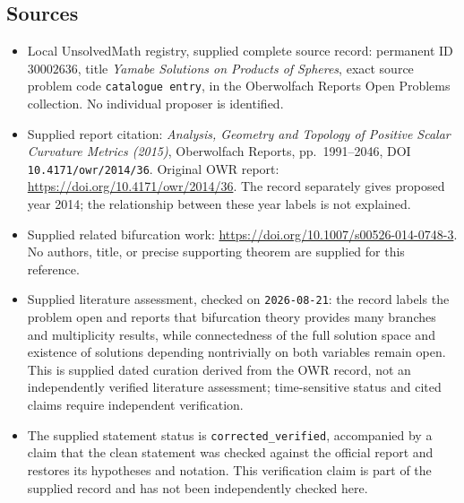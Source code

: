 \documentclass[11pt]{article}
\begin{document}
\subsection{Sources}
\begin{itemize}
\item Local UnsolvedMath registry, supplied complete source record: permanent ID \(30002636\), title \emph{Yamabe Solutions on Products of Spheres}, exact source problem code \texttt{catalogue entry}, in the Oberwolfach Reports Open Problems collection. No individual proposer is identified.
\item Supplied report citation: \emph{Analysis, Geometry and Topology of Positive Scalar Curvature Metrics (2015)}, Oberwolfach Reports, pp.~1991--2046, DOI \texttt{10.4171/owr/2014/36}. Original OWR report: \url{https://doi.org/10.4171/owr/2014/36}. The record separately gives proposed year 2014; the relationship between these year labels is not explained.
\item Supplied related bifurcation work: \url{https://doi.org/10.1007/s00526-014-0748-3}. No authors, title, or precise supporting theorem are supplied for this reference.
\item Supplied literature assessment, checked on \texttt{2026-08-21}: the record labels the problem open and reports that bifurcation theory provides many branches and multiplicity results, while connectedness of the full solution space and existence of solutions depending nontrivially on both variables remain open. This is supplied dated curation derived from the OWR record, not an independently verified literature assessment; time-sensitive status and cited claims require independent verification.
\item The supplied statement status is \texttt{corrected\_verified}, accompanied by a claim that the clean statement was checked against the official report and restores its hypotheses and notation. This verification claim is part of the supplied record and has not been independently checked here.
\end{itemize}
\end{document}
